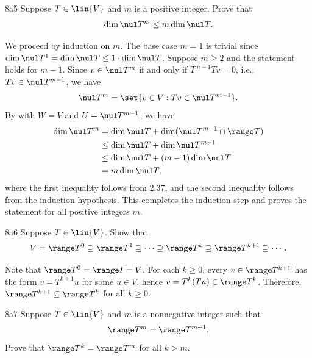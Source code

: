 \begin{exercise}{8a5}
    Suppose $T \in \lin{V}$ and $m$ is a positive integer.
    Prove that
    \[
        \dim \nul T^m \leq m \dim \nul T.
    \]

\end{exercise}

\begin{sol}
    We proceed by induction on $m$.
    The base case $m = 1$ is trivial since $\dim \nul T^1 = \dim \nul T \leq 1 \cdot \dim \nul T$.
    Suppose $m \geq 2$ and the statement holds for $m-1$.
    Since $v \in \nul T^m$ if and only if $T^{m-1} T v = 0$, i.e., $T v \in \nul T^{m-1}$, we have
    \[
        \nul T^m = \set{v \in V : T v \in \nul T^{m-1}}.
    \]
    By  with $W = V$ and $U = \nul T^{m-1}$, we have
    \begin{align*}
        \dim \nul T^m &= \dim \nul T + \dim(\nul T^{m-1} \cap \range T) \\
        &\leq \dim \nul T + \dim \nul T^{m-1} \\
        &\leq \dim \nul T + (m-1) \dim \nul T \\
        &= m \dim \nul T,
    \end{align*}
    where the first inequality follows from 2.37, and the second inequality follows from the induction hypothesis.
    This completes the induction step and proves the statement for all positive integers $m$.
\end{sol}

\begin{exercise}{8a6}
    Suppose $T \in \lin{V}$.
    Show that
    \[
        V = \range T^0 \supseteq \range T^1 \supseteq \cdots \supseteq \range T^k \supseteq \range T^{k+1} \supseteq \cdots.
    \]
\end{exercise}

\begin{sol}
    Note that $\range T^0 = \range I = V$.
    For each $k \geq 0$, every $v \in \range T^{k + 1}$ has the form $v = T^{k+1} u$ for some $u \in V$, hence $v = T^k(Tu) \in \range T^k$.
    Therefore, $\range T^{k + 1} \subseteq \range T^k$ for all $k \geq 0$.
\end{sol}

\begin{exercise}{8a7}
    Suppose $T \in \lin{V}$ and $m$ is a nonnegative integer such that
    \[
        \range T^m = \range T^{m+1}.
    \]
    Prove that $\range T^k = \range T^m$ for all $k > m$.
\end{exercise}

